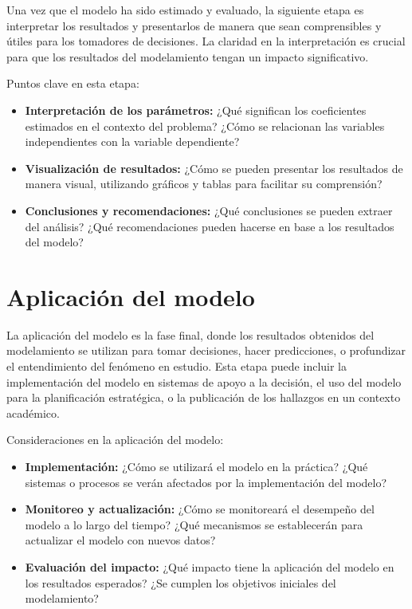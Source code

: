 \documentclass[
  letterpaper,
  DIV=11,
  numbers=noendperiod]{scrreprt}
\providecommand{\tightlist}{%
  \setlength{\itemsep}{0pt}\setlength{\parskip}{0pt}}\usepackage{longtable,booktabs,array}
\begin{document}
Una vez que el modelo ha sido estimado y evaluado, la siguiente etapa es
interpretar los resultados y presentarlos de manera que sean
comprensibles y útiles para los tomadores de decisiones. La claridad en
la interpretación es crucial para que los resultados del modelamiento
tengan un impacto significativo.

Puntos clave en esta etapa:

\begin{itemize}
\tightlist
\item
  \textbf{Interpretación de los parámetros:} ¿Qué significan los
  coeficientes estimados en el contexto del problema? ¿Cómo se
  relacionan las variables independientes con la variable dependiente?
\item
  \textbf{Visualización de resultados:} ¿Cómo se pueden presentar los
  resultados de manera visual, utilizando gráficos y tablas para
  facilitar su comprensión?
\item
  \textbf{Conclusiones y recomendaciones:} ¿Qué conclusiones se pueden
  extraer del análisis? ¿Qué recomendaciones pueden hacerse en base a
  los resultados del modelo?
\end{itemize}

\section{Aplicación del modelo}\label{aplicaciuxf3n-del-modelo}

La aplicación del modelo es la fase final, donde los resultados
obtenidos del modelamiento se utilizan para tomar decisiones, hacer
predicciones, o profundizar el entendimiento del fenómeno en estudio.
Esta etapa puede incluir la implementación del modelo en sistemas de
apoyo a la decisión, el uso del modelo para la planificación
estratégica, o la publicación de los hallazgos en un contexto académico.

Consideraciones en la aplicación del modelo:

\begin{itemize}
\tightlist
\item
  \textbf{Implementación:} ¿Cómo se utilizará el modelo en la práctica?
  ¿Qué sistemas o procesos se verán afectados por la implementación del
  modelo?
\item
  \textbf{Monitoreo y actualización:} ¿Cómo se monitoreará el desempeño
  del modelo a lo largo del tiempo? ¿Qué mecanismos se establecerán para
  actualizar el modelo con nuevos datos?
\item
  \textbf{Evaluación del impacto:} ¿Qué impacto tiene la aplicación del
  modelo en los resultados esperados? ¿Se cumplen los objetivos
  iniciales del modelamiento?
\end{itemize}
\end{document}
